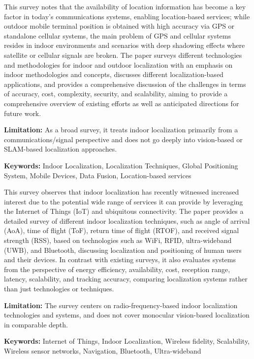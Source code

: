 {
	This survey \cite{Yassin:2017} notes that the availability of location information has become a key factor in today's communications systems, enabling location-based services; while outdoor mobile terminal position is obtained with high accuracy via GPS or standalone cellular systems, the main problem of GPS and cellular systems resides in indoor environments and scenarios with deep shadowing effects where satellite or cellular signals are broken. The paper surveys different technologies and methodologies for indoor and outdoor localization with an emphasis on indoor methodologies and concepts, discusses different localization-based applications, and provides a comprehensive discussion of the challenges in terms of accuracy, cost, complexity, security, and scalability, aiming to provide a comprehensive overview of existing efforts as well as anticipated directions for future work.
	
	\bigskip
	\textbf{Limitation:} As a broad survey, it treats indoor localization primarily from a communications/signal perspective and does not go deeply into vision-based or SLAM-based localization approaches.
	
	\scriptsize{\textbf{Keywords:} Indoor Localization, Localization Techniques, Global Positioning System, Mobile Devices, Data Fusion, Location-based services}
}

{
	This survey \cite{Zafari:2019} observes that indoor localization has recently witnessed increased interest due to the potential wide range of services it can provide by leveraging the Internet of Things (IoT) and ubiquitous connectivity. The paper provides a detailed survey of different indoor localization techniques, such as angle of arrival (AoA), time of flight (ToF), return time of flight (RTOF), and received signal strength (RSS), based on technologies such as WiFi, RFID, ultra-wideband (UWB), and Bluetooth, discussing localization and positioning of human users and their devices. In contrast with existing surveys, it also evaluates systems from the perspective of energy efficiency, availability, cost, reception range, latency, scalability, and tracking accuracy, comparing localization systems rather than just technologies or techniques.
	
	\bigskip
	\textbf{Limitation:} The survey centers on radio-frequency-based indoor localization technologies and systems, and does not cover monocular vision-based localization in comparable depth.
	
	\scriptsize{\textbf{Keywords:} Internet of Things, Indoor Localization, Wireless fidelity, Scalability, Wireless sensor networks, Navigation, Bluetooth, Ultra-wideband}
}

